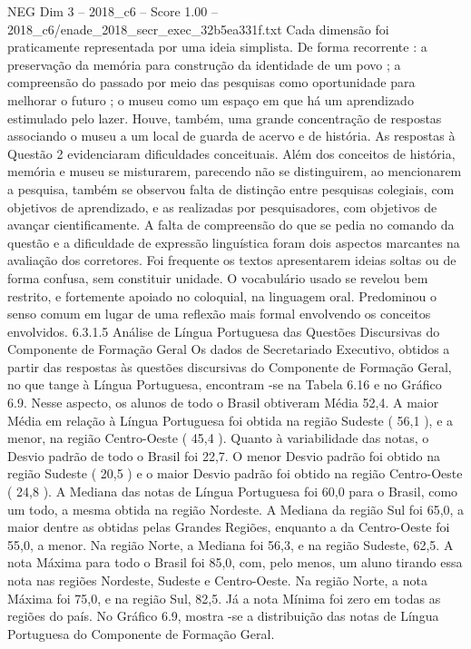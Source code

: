 \begin{textsample}{NEG Dim 3 – 2018\_c6 – Score 1.00 – 2018\_c6/enade\_2018\_secr\_exec\_32b5ea331f.txt}
Cada dimensão foi praticamente representada por uma ideia simplista.
De forma recorrente : a preservação da memória para construção da identidade de um povo ; a compreensão do passado por meio das pesquisas como oportunidade para melhorar o futuro ; o museu como um espaço em que há um aprendizado estimulado pelo lazer.
Houve, também, uma grande concentração de respostas associando o museu a um local de guarda de acervo e de história.
As respostas à Questão 2 evidenciaram dificuldades conceituais.
Além dos conceitos de história, memória e museu se misturarem, parecendo não se distinguirem, ao mencionarem a pesquisa, também se observou falta de distinção entre pesquisas colegiais, com objetivos de aprendizado, e as realizadas por pesquisadores, com objetivos de avançar cientificamente.
A falta de compreensão do que se pedia no comando da questão e a dificuldade de expressão linguística foram dois aspectos marcantes na avaliação dos corretores.
Foi frequente os textos apresentarem ideias soltas ou de forma confusa, sem constituir unidade.
O vocabulário usado se revelou bem restrito, e fortemente apoiado no coloquial, na linguagem oral.
Predominou o senso comum em lugar de uma reflexão mais formal envolvendo os conceitos envolvidos. 6.3.1.5 Análise de Língua Portuguesa das Questões Discursivas do Componente de Formação Geral Os dados de Secretariado Executivo, obtidos a partir das respostas às questões discursivas do Componente de Formação Geral, no que tange à Língua Portuguesa, encontram -se na Tabela 6.16 e no Gráfico 6.9.
Nesse aspecto, os alunos de todo o Brasil obtiveram Média 52,4.
A maior Média em relação à Língua Portuguesa foi obtida na região Sudeste ( 56,1 ), e a menor, na região Centro-Oeste ( 45,4 ).
Quanto à variabilidade das notas, o Desvio padrão de todo o Brasil foi 22,7.
O menor Desvio padrão foi obtido na região Sudeste ( 20,5 ) e o maior Desvio padrão foi obtido na região Centro-Oeste ( 24,8 ).
A Mediana das notas de Língua Portuguesa foi 60,0 para o Brasil, como um todo, a mesma obtida na região Nordeste.
A Mediana da região Sul foi 65,0, a maior dentre as obtidas pelas Grandes Regiões, enquanto a da Centro-Oeste foi 55,0, a menor.
Na região Norte, a Mediana foi 56,3, e na região Sudeste, 62,5.
A nota Máxima para todo o Brasil foi 85,0, com, pelo menos, um aluno tirando essa nota nas regiões Nordeste, Sudeste e Centro-Oeste.
Na região Norte, a nota Máxima foi 75,0, e na região Sul, 82,5.
Já a nota Mínima foi zero em todas as regiões do país.
No Gráfico 6.9, mostra -se a distribuição das notas de Língua Portuguesa do Componente de Formação Geral.

\end{textsample}
